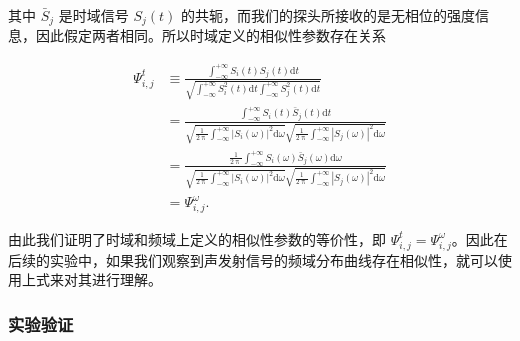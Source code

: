 其中 $\bar{S}_{j}$ 是时域信号 $S_{j}(t)$ 的共轭，而我们的探头所接收的是无相位的强度信息，因此假定两者相同。所以时域定义的相似性参数存在关系

\begin{equation}
  \begin{aligned}
    \Psi_{i,j}^{t} &\equiv \frac{\int_{-\infty}^{+\infty}S_{i}(t)S_{j}(t)\mathrm{d}t}{\sqrt{\int_{-\infty}^{+\infty}S_{i}^{2}(t)\mathrm{d}t\int_{-\infty}^{+\infty}S_{j}^{2}(t)\mathrm{d}t}}\\
    &= \frac{\int_{-\infty}^{+\infty}S_{i}(t)\bar{S}_{j}(t)\mathrm{d}t}{\sqrt{\frac{1}{2\uppi}\int_{-\infty}^{+\infty}|S_{i}(\omega)|^{2}\mathrm{d}\omega}\sqrt{\frac{1}{2\uppi}\int_{-\infty}^{+\infty}|S_{j}(\omega)|^{2}\mathrm{d}\omega}}\\
    &= \frac{\frac{1}{2\uppi}\int_{-\infty}^{+\infty}S_{i}(\omega)\bar{S}_{j}(\omega)\mathrm{d}\omega}{\sqrt{\frac{1}{2\uppi}\int_{-\infty}^{+\infty}|S_{i}(\omega)|^{2}\mathrm{d}\omega}\sqrt{\frac{1}{2\uppi}\int_{-\infty}^{+\infty}|S_{j}(\omega)|^{2}\mathrm{d}\omega}}\\
    &= \Psi_{i,j}^{\omega}.
  \end{aligned}
\end{equation}

由此我们证明了时域和频域上定义的相似性参数的等价性，即 $\Psi_{i,j}^{t}=\Psi_{i,j}^{\omega}$。因此在后续的实验中，如果我们观察到声发射信号的频域分布曲线存在相似性，就可以使用上式来对其进行理解。

\subsubsection{实验验证}


